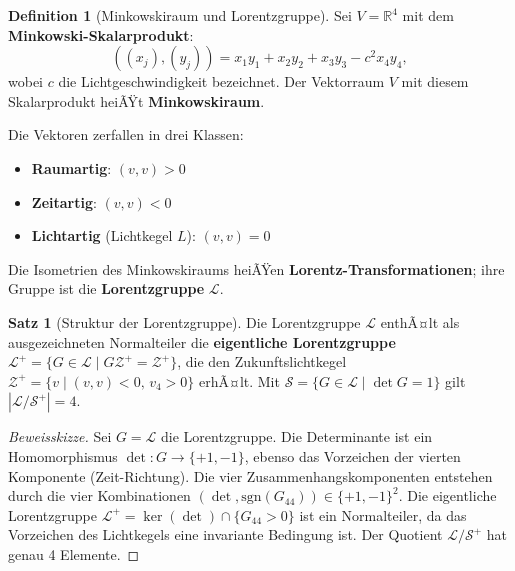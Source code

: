 ﻿\documentclass[a4paper,12pt]{report}
\theoremstyle{definition}
\newtheorem{definition}{Definition}
\newtheorem{satz}{Satz}
\begin{document}
\begin{definition}[Minkowskiraum und Lorentzgruppe]
    Sei $V = \mathbb{R}^4$ mit dem \textbf{Minkowski-Skalarprodukt}:
    \[
        ((x_j), (y_j)) = x_1 y_1 + x_2 y_2 + x_3 y_3 - c^2 x_4 y_4,
    \]
    wobei $c$ die Lichtgeschwindigkeit bezeichnet. Der Vektorraum $V$
    mit diesem Skalarprodukt heiÃŸt \textbf{Minkowskiraum}.

    Die Vektoren zerfallen in drei Klassen:
    \begin{itemize}
        \item[-] \textbf{Raumartig}: $(v, v) > 0$
        \item[-] \textbf{Zeitartig}: $(v, v) < 0$
        \item[-] \textbf{Lichtartig} (Lichtkegel $L$): $(v, v) = 0$
    \end{itemize}
    Die Isometrien des Minkowskiraums heiÃŸen \textbf{Lorentz-Transformationen};
    ihre Gruppe ist die \textbf{Lorentzgruppe} $\mathcal{L}$.
\end{definition}

\begin{satz}[Struktur der Lorentzgruppe]
    Die Lorentzgruppe $\mathcal{L}$ enthÃ¤lt als ausgezeichneten Normalteiler
    die \textbf{eigentliche Lorentzgruppe} $\mathcal{L}^+ = \{G \in \mathcal{L}
    \mid G \mathcal{Z}^+ = \mathcal{Z}^+\}$, die den Zukunftslichtkegel
    $\mathcal{Z}^+ = \{v \mid (v,v) < 0,\, v_4 > 0\}$ erhÃ¤lt.
    Mit $\mathcal{S} = \{G \in \mathcal{L} \mid \det G = 1\}$ gilt
    $|\mathcal{L}/\mathcal{S}^+| = 4$.
\end{satz}
\begin{proof}[Beweisskizze]
    Sei $G = \mathcal{L}$ die Lorentz\-gruppe. Die Determinante ist ein
    Homomorphismus $\det : G \to \{+1, -1\}$, ebenso das Vorzeichen
    der vierten Komponente (Zeit-Richtung). Die vier Zusammenhangskomponenten
    entstehen durch die vier Kombinationen
    $(\det, \mathrm{sgn}(G_{44})) \in \{+1,-1\}^2$.
    Die eigentliche Lorentzgruppe $\mathcal{L}^+ = \ker(\det) \cap \{G_{44} > 0\}$
    ist ein Normalteiler, da das Vorzeichen des Lichtkegels eine invariante
    Bedingung ist. Der Quotient $\mathcal{L}/\mathcal{S}^+$ hat genau
    4 Elemente.
\end{proof}
\end{document}
